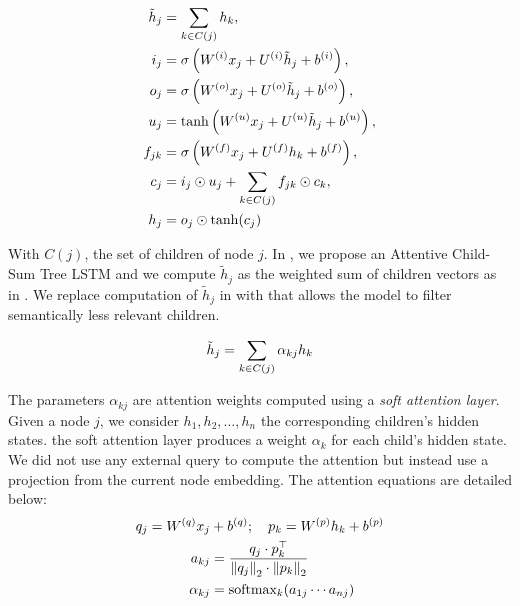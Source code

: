\begin{align}
\tilde{h}_j &= \sum_{k \in C(j)} h_k, \labeq{treelstm-def} \\
i_j &=\sigma \left( W^{(i)} x_j + U^{(i)} \tilde{h}_j + b^{(i)} \right), \\
o_j &=\sigma \left( W^{(o)} x_j + U^{(o)} \tilde{h}_j + b^{(o)} \right), \\
u_j &=\tanh \left( W^{(u)} x_j + U^{(u)} \tilde{h}_j + b^{(u)} \right), \\
f_{jk} &= \sigma\left( W^{(f)} x_j + U^{(f)} h_k + b^{(f)} \right), \labeq{treelstm-def-f}\\
c_j &= i_j \odot u_j + \sum_{k\in C(j)} f_{jk} \odot c_{k}, \\
h_j &= o_j \odot \tanh(c_j) \labeq{treelstm-def-last}
\end{align}


With $C(j)$, the set of children of node $j$. In \textcite{simoulin_2021a}, we propose an Attentive Child-Sum Tree LSTM and we compute $\tilde{h}_j$ as the weighted sum of children vectors as in \textcite{zhou_16}. We replace computation of $\tilde{h}_j$ in  with  that allows the model to filter semantically less relevant children.

\begin{equation}
    \tilde{h}_j = \sum_{k \in C(j)} \alpha_{kj} h_k \labeq{treelstm-att} 
\end{equation}

The parameters $\alpha_{kj}$ are attention weights computed using a \emph{soft attention layer}. Given a node $j$, we consider $h_1, h_2, \dots, h_{n}$ the corresponding children's hidden states. the soft attention layer produces a weight $\alpha_k$ for each child's hidden state. We did not use any external query to compute the attention but instead use a projection from the current node embedding. The attention equations are detailed below:
\begin{align}
    q_j = W^{(q)}x_j& +b^{(q)} ;\quad p_k = W^{(p)}h_k +b^{(p)} \\
    a_{kj} &= \frac{q_j \cdot p_k^{\top}}{\left\lVert q_j\right\rVert_2\cdot\left\lVert p_k\right\rVert_2} \label{eq:attention-w} \\
    \alpha_{kj} &= \text{softmax}_k(a_{1j} \cdots a_{nj})
\end{align}

